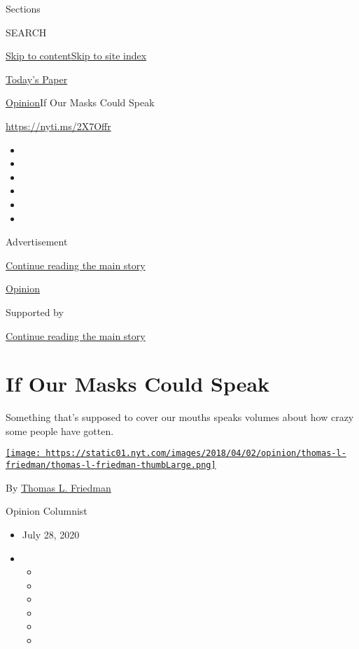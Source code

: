 Sections

SEARCH

\protect\hyperlink{site-content}{Skip to
content}\protect\hyperlink{site-index}{Skip to site index}

\href{https://myaccount.nytimes.com/auth/login?response_type=cookie\&client_id=vi}{}

\href{https://www.nytimes.com/section/todayspaper}{Today's Paper}

\href{/section/opinion}{Opinion}\textbar{}If Our Masks Could Speak

\href{https://nyti.ms/2X7Offr}{https://nyti.ms/2X7Offr}

\begin{itemize}
\item
\item
\item
\item
\item
\item
\end{itemize}

Advertisement

\protect\hyperlink{after-top}{Continue reading the main story}

\href{/section/opinion}{Opinion}

Supported by

\protect\hyperlink{after-sponsor}{Continue reading the main story}

\hypertarget{if-our-masks-could-speak}{%
\section{If Our Masks Could Speak}\label{if-our-masks-could-speak}}

Something that's supposed to cover our mouths speaks volumes about how
crazy some people have gotten.

\href{https://www.nytimes.com/by/thomas-l-friedman}{\texttt{[image: https://static01.nyt.com/images/2018/04/02/opinion/thomas-l-friedman/thomas-l-friedman-thumbLarge.png]}}

By \href{https://www.nytimes.com/by/thomas-l-friedman}{Thomas L.
Friedman}

Opinion Columnist

\begin{itemize}
\item
  July 28, 2020
\item
  \begin{itemize}
  \item
  \item
  \item
  \item
  \item
  \item
  \end{itemize}
\end{itemize}

